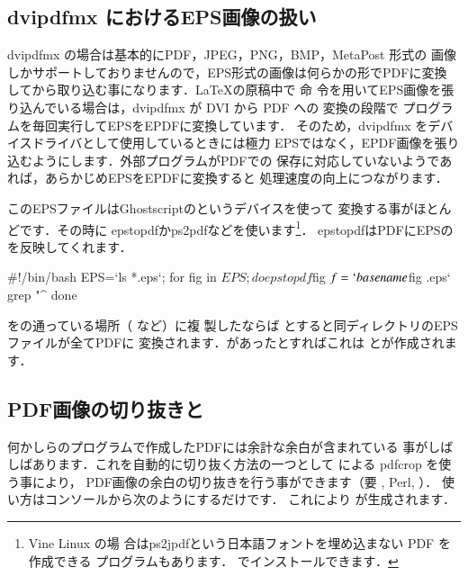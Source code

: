 \subsection{dvipdfmx におけるEPS画像の扱い}

dvipdfmx の場合は基本的にPDF，JPEG，PNG，BMP，MetaPost 形式の
画像しかサポートしておりませんので，EPS形式の画像は何らかの形でPDFに変換
してから取り込む事になります．\LaTeX の原稿中で 命
令を用いてEPS画像を張り込んでいる場合は，dvipdfmx が DVI から PDF への
変換の段階で \GS プログラムを毎回実行してEPSをEPDFに変換しています．
そのため，dvipdfmx をデバイスドライバとして使用しているときには極力
EPSではなく，EPDF画像を張り込むようにします．外部プログラムがPDFでの
保存に対応していないようであれば，あらかじめEPSをEPDFに変換すると
処理速度の向上につながります．

このEPSファイルは{Ghostscript}のというデバイスを使って
変換する事がほとんどです．その時に
{epstopdf}か{ps2pdf}などを使います\footnote{Vine Linux の場
合は{ps2jpdf}という日本語フォントを埋め込まない PDF を作成できる
プログラムもあります．
でインストールできます．}．
{epstopdf}はPDFにEPSの{\BB}を反映してくれます．

\begin{intext}
#!/bin/bash
EPS=`ls *.eps`;
for fig in $EPS; do
   epstopdf $fig
   $f=`basename $fig .eps`
   grep "^%
done
\end{intext}

をの通っている場所（ など）に複
製したならば
とすると同ディレクトリのEPSファイルが全てPDFに
変換されます．があったとすればこれは
とが作成されます．


\subsection{PDF画像の切り抜きと\BB}

何かしらのプログラムで作成したPDFには余計な余白が含まれている
事がしばしばあります．これを自動的に切り抜く方法の一つとして
による {pdfcrop} を使う事により，
PDF画像の余白の切り抜きを行う事ができます（要 \PDFTeX, Perl, \GS）．
使い方はコンソールから次のようにするだけです．
これにより が生成されます．

